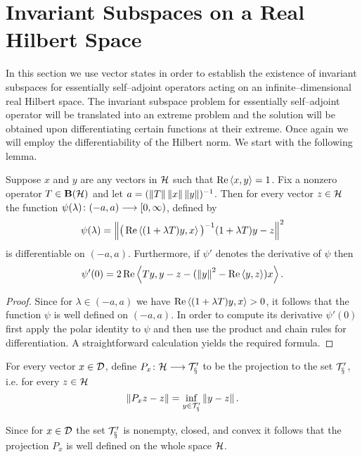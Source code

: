 \goodbreak
\section{Invariant Subspaces on a Real Hilbert Space}

In this section we use vector states in order to establish the existence of
invariant subspaces for essentially self--adjoint operators acting on an
infinite--dimensional real Hilbert space. The invariant subspace problem for
essentially self--adjoint operator will be translated into an extreme problem
and the solution will be obtained upon differentiating certain functions at
their extreme. Once again we will employ the differentiability of the Hilbert
norm. We start with the following lemma.

\begin{lem}\label{l:DIFF}
Suppose $x$ and $y$ are any vectors in ${\cal H}$ such that $\operatorname{Re}\left<x,y\right>=1$. Fix a
nonzero operator $T\in\mathbf B(\cal H)$ and let $a=(\left\Vert T\right\Vert\left\Vert x\right\Vert\left\Vert y\right\Vert)^{-1}$. Then
for every vector $z\in{\cal H}$ the function $\psi(\lambda)\colon(-a,a)\longrightarrow[0,\infty)$,
defined by
\[ \psi(\lambda) = \left\Vert
   \big(\operatorname{Re}\left<(1+\lambda T)y, x\right>\big)^{-1} (1+\lambda T)y - z\right\Vert^2 \]
is differentiable on $(-a,a)$. Furthermore, if $\psi'$ denotes the derivative
of $\psi$ then
\[ \psi'(0) = 2\operatorname{Re}\left<T y, y - z - (\left\Vert y\right\Vert^2-\operatorname{Re}\left<y,z\right>) x\right>. \]
\end{lem}

\begin{proof}
Since for $\lambda\in(-a,a)$ we have $\operatorname{Re}\left<(1+\lambda T)y, x\right>>0$, it
follows that the function $\psi$ is well defined on $(-a,a)$. In order to
compute its derivative $\psi'(0)$ first apply the polar identity to $\psi$
and then use the product and chain rules for differentiation. A
straightforward calculation yields the required formula.
\end{proof}

\begin{defn}
For every vector $x\in{\cal{D}}$, define $P_x\colon{\cal H}\longrightarrow\cal{T}'_x$ to be the
projection to the set $\cal{T}'_x$, \,\,i.e. for every $z\in{\cal H}$
\[ \left\Vert P_x z - z\right\Vert = \inf_{y\in\cal{T}'_x} \left\Vert y-z\right\Vert. \]
\end{defn}

\begin{rem}
Since for $x\in{\cal{D}}$ the set $\cal{T}'_x$ is nonempty, closed, and convex it
follows that the projection $P_x$ is well defined on the whole space ${\cal H}$.
\end{rem}

